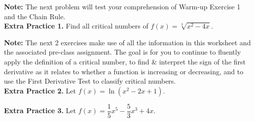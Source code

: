 \documentclass[10pt]{article}
\begin{document}
\newpage
{\bf Note:} The next problem will test your comprehension of Warm-up Exercise 1 and the Chain Rule.\\

{\bf\color{blue} Extra Practice 1.} Find all critical numbers of $f(x)=\sqrt[3]{x^2-4x}$.






{\bf Note:} The next 2 exercises make use of all the information in this worksheet and the associated pre-class assignment. The goal is for you to continue to fluently apply the definition of a critical number, to find \& interpret the sign of the first derivative as it relates to whether a function is increasing or decreasing, and to use the First Derivative Test to classify critical numbers.\\

{\bf\color{blue} Extra Practice 2.} Let $f(x)=\ln(x^2-2x+1)$. 

\newpage%

{\bf\color{blue} Extra Practice 3.} Let $f(x)=\dfrac15x^5-\dfrac53x^3+4x$.
\end{document}
